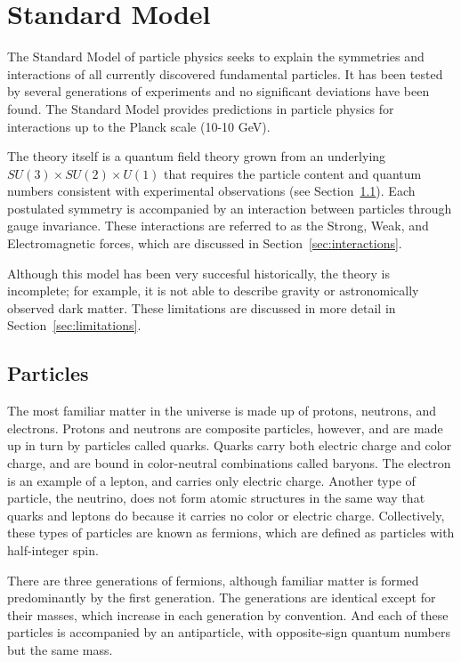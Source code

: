 \chapter{Standard Model}

\label{ch:standardmodel}

The Standard Model of particle physics seeks to explain the symmetries and interactions of all currently discovered fundamental particles. 
It has been tested by several generations of experiments and no significant deviations have been found. 
The Standard Model provides predictions in particle physics for interactions up to the Planck scale (10-10 GeV). 

The theory itself is a quantum field theory grown from an underlying $SU(3) \times SU(2) \times U(1)$ that requires the particle content and quantum numbers consistent with experimental observations (see Section~\ref{sec:particles}). 
Each postulated symmetry is accompanied by an interaction between particles through gauge invariance. 
These interactions are referred to as the Strong, Weak, and Electromagnetic forces, which are discussed in Section~\ref{sec:interactions}. 

Although this model has been very succesful historically, the theory is incomplete; for example, it is not able to describe gravity or astronomically observed dark matter. 
These limitations are discussed in more detail in Section~\ref{sec:limitations}. 

\section{Particles}
\label{sec:particles}

The most familiar matter in the universe is made up of protons, neutrons, and electrons. 
Protons and neutrons are composite particles, however, and are made up in turn by particles called quarks. 
Quarks carry both electric charge and color charge, and are bound in color-neutral combinations called baryons. 
The electron is an example of a lepton, and carries only electric charge. 
Another type of particle, the neutrino, does not form atomic structures in the same way that quarks and leptons do because it carries no color or electric charge. 
Collectively, these types of particles are known as fermions, which are defined as particles with half-integer spin. 

There are three generations of fermions, although familiar matter is formed predominantly by the first generation. 
The generations are identical except for their masses, which increase in each generation by convention. 
And each of these particles is accompanied by an antiparticle, with opposite-sign quantum numbers but the same mass.

